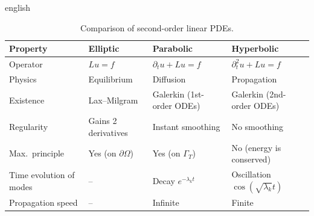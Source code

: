 \documentclass[0000.tex]{subfiles}
\begin{document}
\begin{hyphenrules}{english}
\begin{table}[htbp]
  \centering
  \caption{Comparison of second-order linear PDEs.}
  \label{tab:second-order}
  \small
  \begin{tabularx}{\linewidth}{@{}lXXX@{}}
    \toprule
    Property & Elliptic & Parabolic & Hyperbolic \\
    \midrule
    Operator        & $Lu=f$             & $\partial_t u+Lu=f$  & $\partial_t^2u+Lu=f$ \\
    Physics         & Equilibrium        & Diffusion            & Propagation \\
    Existence       & Lax--Milgram       & Galerkin (1st-order ODEs) & Galerkin (2nd-order ODEs) \\
    Regularity      & Gains 2 derivatives & Instant smoothing   & No smoothing \\
    Max.\ principle & Yes (on $\partial\Omega$) & Yes (on $\Gamma_T$) & No (energy is conserved) \\
    Time evolution of modes & --       & Decay $e^{-\lambda_k t}$ & Oscillation $\cos(\sqrt{\lambda_k}t)$ \\
    Propagation speed & --             & Infinite             & Finite \\
    \bottomrule
  \end{tabularx}
\end{table}


\end{hyphenrules}
\end{document}

